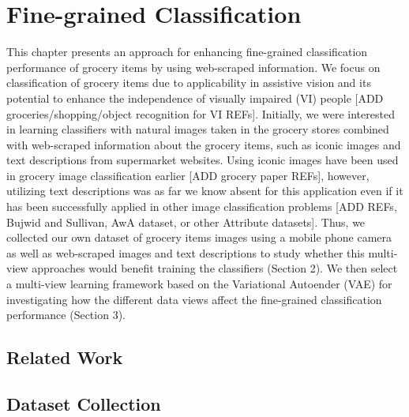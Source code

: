 
\chapter{Fine-grained Classification}
\label{chap:finegrained_classification}


This chapter presents an approach for enhancing fine-grained classification performance of grocery items by using web-scraped information. We focus on classification of grocery items due to applicability in assistive vision and its potential to enhance the independence of visually impaired (VI) people [ADD groceries/shopping/object recognition for VI REFs]. Initially, we were interested in learning classifiers with natural images taken in the grocery stores combined with web-scraped information about the grocery items, such as iconic images and text descriptions from supermarket websites. Using iconic images have been used in grocery image classification earlier [ADD grocery paper REFs], however, utilizing text descriptions was as far we know absent for this application even if it has been successfully applied in other image classification problems [ADD REFs, Bujwid and Sullivan, AwA dataset, or other Attribute datasets]. Thus, we collected our own dataset of grocery items images using a mobile phone camera as well as web-scraped images and text descriptions to study whether this multi-view approaches would benefit training the classifiers (Section 2). We then select a multi-view learning framework based on the Variational Autoender (VAE) for investigating how the different data views affect the fine-grained classification performance (Section 3). 

\section{Related Work}
\section{Dataset Collection}
